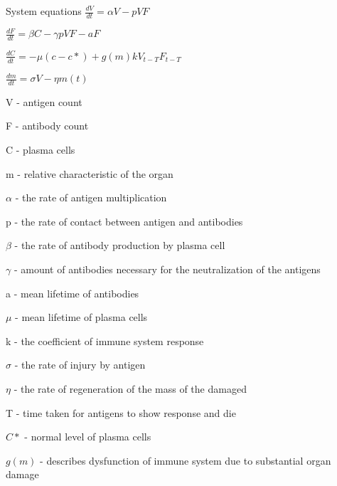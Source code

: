\documentclass{beamer}
\begin{document}
\begin{frame}{System equations}
$\frac{dV}{dt}=\alpha V-pVF$
 

$\frac{dF}{dt}=\beta C-\gamma pVF-aF$
 

$\frac{dC}{dt}=-\mu\left(c-c*\right)+g\left(m\right)kV_{t-T}F_{t-T}$
 

$\frac{dm}{dt}=\sigma V-\eta m\left(t\right)$
 

V - antigen count

F - antibody count

C - plasma cells

m - relative characteristic of the organ

$\alpha$ - the rate of antigen multiplication

p - the rate of contact between antigen and antibodies

$\beta$ - the rate of antibody production by plasma cell
\end{frame}
\begin{frame}
$\gamma$ - amount of antibodies necessary for the neutralization of the antigens

a - mean lifetime of antibodies

$\mu$ - mean lifetime of plasma cells

k  - the coefficient of immune system response

$\sigma$ - the rate of injury by antigen

$\eta$ - the rate of regeneration of the mass of the damaged

T - time taken for antigens to show response and die

$C*$ - normal level of plasma cells

$g(m)$ - describes dysfunction of immune system due to substantial organ damage
\end{frame}
\end{document}
